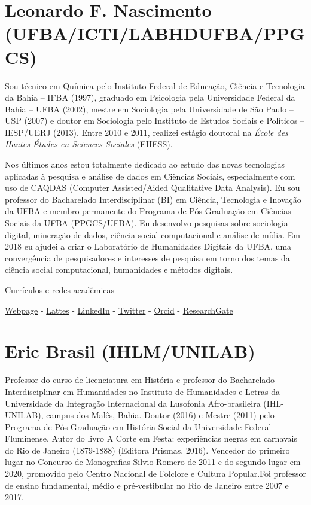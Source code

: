 \documentclass[
]{book}
\begin{document}
\hypertarget{leonardo-f.-nascimento-ufbaictilabhdufbappgcs}{%
\section{Leonardo F. Nascimento (UFBA/ICTI/LABHDUFBA/PPGCS)}\label{leonardo-f.-nascimento-ufbaictilabhdufbappgcs}}

Sou técnico em Química pelo Instituto Federal de Educação, Ciência e Tecnologia da Bahia -- IFBA (1997), graduado em Psicologia pela Universidade Federal da Bahia -- UFBA (2002), mestre em Sociologia pela Universidade de São Paulo -- USP (2007) e doutor em Sociologia pelo Instituto de Estudos Sociais e Políticos -- IESP/UERJ (2013). Entre 2010 e 2011, realizei estágio doutoral na \emph{École des Hautes Études en Sciences Sociales} (EHESS).

Nos últimos anos estou totalmente dedicado ao estudo das novas tecnologias aplicadas à pesquisa e análise de dados em Ciências Sociais, especialmente com uso de CAQDAS (Computer Assisted/Aided Qualitative Data Analysis). Eu sou professor do Bacharelado Interdisciplinar (BI) em Ciência, Tecnologia e Inovação da UFBA e membro permanente do Programa de Pós-Graduação em Ciências Sociais da UFBA (PPGCS/UFBA). Eu desenvolvo pesquisas sobre sociologia digital, mineração de dados, ciência social computacional e análise de mídia. Em 2018 eu ajudei a criar o Laboratório de Humanidades Digitais da UFBA, uma convergência de pesquisadores e interesses de pesquisa em torno dos temas da ciência social computacional,
humanidades e métodos digitais.

Currículos e redes acadêmicas

\href{https://leofn.com/}{Webpage} -
\href{http://lattes.cnpq.br/7141811368487014}{Lattes} - \href{https://www.linkedin.com/in/leonardo-nascimento-labhdufba/}{LinkedIn} - \href{https://twitter.com/leofn3}{Twitter} -
\href{https://orcid.org/0000-0003-2929-1115}{Orcid} - \href{https://www.researchgate.net/profile/Leonardo-Nascimento-2}{ResearchGate}

\hypertarget{eric-brasil-ihlmunilab}{%
\section{Eric Brasil (IHLM/UNILAB)}\label{eric-brasil-ihlmunilab}}

Professor do curso de licenciatura em História e professor do Bacharelado Interdisciplinar em Humanidades no Instituto de Humanidades e Letras da Universidade da Integração Internacional da Lusofonia Afro-brasileira (IHL-UNILAB), campus dos Malês, Bahia. Doutor (2016) e Mestre (2011) pelo Programa de Pós-Graduação em História Social da Universidade Federal Fluminense. Autor do livro A Corte em Festa: experiências negras em carnavais do Rio de Janeiro (1879-1888) (Editora Prismas, 2016). Vencedor do primeiro lugar no Concurso de Monografias Silvio Romero de 2011 e do segundo lugar em 2020, promovido pelo Centro Nacional de Folclore e Cultura Popular.Foi professor de ensino fundamental, médio e pré-vestibular no Rio de Janeiro entre 2007 e 2017.
\end{document}
